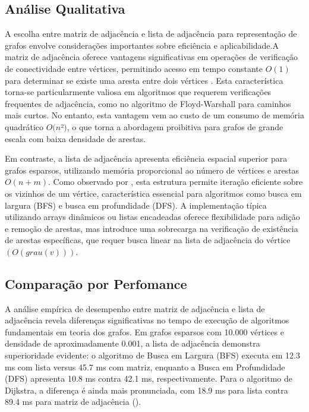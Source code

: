 \documentclass{sbc2023}%
\begin{document}
\subsection{Análise Qualitativa}
A escolha entre matriz de adjacência e lista de adjacência para representação de grafos envolve considerações importantes sobre eficiência e aplicabilidade.A matriz de adjacência oferece vantagens significativas em operações de verificação de conectividade entre vértices, permitindo acesso em tempo constante \( O(1) \) para determinar se existe uma aresta entre dois vértices \cite{diferencas}. Esta característica torna-se particularmente valiosa em algoritmos que requerem verificações frequentes de adjacência, como no algoritmo de Floyd-Warshall para caminhos mais curtos. No entanto, esta vantagem vem ao custo de um consumo de memória quadrático \( O(n\)²\() \), o que torna a abordagem proibitiva para grafos de grande escala com baixa densidade de arestas.

Em contraste, a lista de adjacência apresenta eficiência espacial superior para grafos esparsos, utilizando memória proporcional ao número de vértices e arestas \( O(n + m) \). Como observado por \cite{diferencas}, esta estrutura permite iteração eficiente sobre os vizinhos de um vértice, característica essencial para algoritmos como busca em largura (BFS) e busca em profundidade (DFS). A implementação típica utilizando arrays dinâmicos ou listas encadeadas oferece flexibilidade para adição e remoção de arestas, mas introduce uma sobrecarga na verificação de existência de arestas específicas, que requer busca linear na lista de adjacência do vértice \((O(grau(v)))\).

\subsection{Comparação por Perfomance}

A análise empírica de desempenho entre matriz de adjacência e lista de adjacência revela diferenças significativas no tempo de execução de algoritmos fundamentais em teoria dos grafos. Em grafos esparsos com 10.000 vértices e densidade de aproximadamente 0.001, a lista de adjacência demonstra superioridade evidente: o algoritmo de Busca em Largura (BFS) executa em 12.3 ms com lista versus 45.7 ms com matriz, enquanto a Busca em Profundidade (DFS) apresenta 10.8 ms contra 42.1 ms, respectivamente. Para o algoritmo de Dijkstra, a diferença é ainda mais pronunciada, com 18.9 ms para lista contra 89.4 ms para matriz de adjacência (\cite{valiente2022adjacency}).
\end{document}
